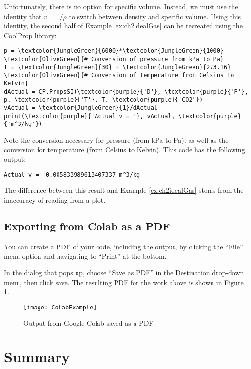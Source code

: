 Unfortunately, there is no option for specific volume.  Instead, we must use the identity that $v = 1/{\rho}$ to switch between density and specific volume.
Using this identity, the second half of Example \ref{ex:ch2idealGas} can be recreated using the CoolProp library:
\begin{Verbatim}[commandchars=\\\{\}]
p = \textcolor{JungleGreen}{6000}*\textcolor{JungleGreen}{1000}          \textcolor{OliveGreen}{# Conversion of pressure from kPa to Pa}
T = \textcolor{JungleGreen}{30} + \textcolor{JungleGreen}{273.16}        \textcolor{OliveGreen}{# Conversion of temperature from Celsius to Kelvin}
dActual = CP.PropsSI(\textcolor{purple}{'D'}, \textcolor{purple}{'P'}, p, \textcolor{purple}{'T'}, T, \textcolor{purple}{'CO2'})
vActual = \textcolor{JungleGreen}{1}/dActual
print(\textcolor{purple}{'Actual v = '}, vActual, \textcolor{purple}{'m^3/kg'})   
\end{Verbatim}

Note the conversion necessary for pressure (from kPa to Pa), as well as the conversion for temperature (from Celsius to Kelvin).  This code has the following output:
\begin{Verbatim}
Actual v =  0.005833989613407337 m^3/kg
\end{Verbatim}
The difference between this result and Example \ref{ex:ch2idealGas} stems from the inaccuracy of reading from a plot.

\subsection{Exporting from Colab as a PDF}
You can create a PDF of your code, including the output, by clicking the ``File'' menu option and navigating to ``Print'' at the bottom.

In the dialog that pops up, choose ``Save as PDF'' in the Destination drop-down menu, then click save.  The resulting PDF for the work above is shown in Figure \ref{fig:ch2_Colab}.

\begin{figure}[H]
\centering
\texttt{[image: ColabExample]}
\caption{Output from Google Colab saved as a PDF.}
\label{fig:ch2_Colab}
\end{figure}


\section{Summary}

